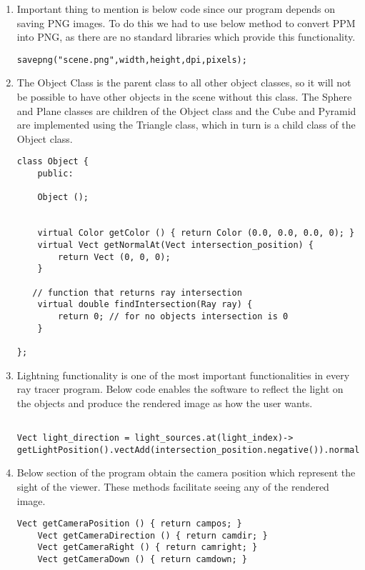 \documentclass{article}
\begin{document}
\begin{enumerate}
\item Important thing to mention is below code since our program depends on saving PNG images. To do this we had to use below method to convert PPM into PNG, as there are no standard libraries which provide this functionality. 
\begin{lstlisting}
savepng("scene.png",width,height,dpi,pixels);
\end{lstlisting}


\item The Object Class is the parent class to all other object classes, so it will not be possible to have other objects in the scene without this class. The Sphere and Plane classes are children of the Object class and the Cube and Pyramid are implemented using the Triangle class, which in turn is a child class of the Object class.

\begin{lstlisting}
class Object {
    public: 

    Object (); 

    
    virtual Color getColor () { return Color (0.0, 0.0, 0.0, 0); } 
    virtual Vect getNormalAt(Vect intersection_position) {
        return Vect (0, 0, 0);
    }

   // function that returns ray intersection
    virtual double findIntersection(Ray ray) {
        return 0; // for no objects intersection is 0
    }

}; \end{lstlisting}

\item Lightning functionality is one of the most important functionalities in every ray tracer program. Below code enables the software to reflect the light on the objects and produce the rendered image as how the user wants.

\begin{lstlisting}

Vect light_direction = light_sources.at(light_index)->
getLightPosition().vectAdd(intersection_position.negative()).normalize(); 

\end{lstlisting}

\item Below section of the program obtain the camera position which represent the sight of the viewer. These methods facilitate seeing any of the rendered image. 

\begin{lstlisting}
Vect getCameraPosition () { return campos; }
    Vect getCameraDirection () { return camdir; }
    Vect getCameraRight () { return camright; }
    Vect getCameraDown () { return camdown; }
    

\end{lstlisting}
\end{enumerate}
\end{document}
